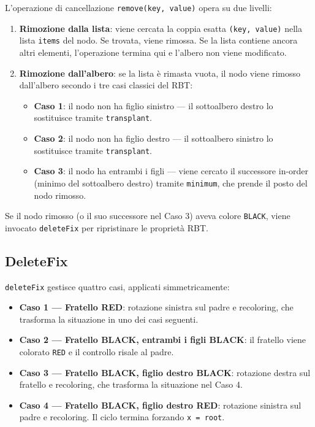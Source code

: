 L'operazione di cancellazione \texttt{remove(key, value)} opera su due livelli:

\begin{enumerate}
    \item \textbf{Rimozione dalla lista}: viene cercata la coppia esatta 
    \texttt{(key, value)} nella lista \texttt{items} del nodo. Se trovata, 
    viene rimossa. Se la lista contiene ancora altri elementi, l'operazione 
    termina qui e l'albero non viene modificato.
    \item \textbf{Rimozione dall'albero}: se la lista è rimasta vuota, il nodo 
    viene rimosso dall'albero secondo i tre casi classici del RBT:
    \begin{itemize}
        \item \textbf{Caso 1}: il nodo non ha figlio sinistro --- il sottoalbero 
        destro lo sostituisce tramite \texttt{transplant}.
        \item \textbf{Caso 2}: il nodo non ha figlio destro --- il sottoalbero 
        sinistro lo sostituisce tramite \texttt{transplant}.
        \item \textbf{Caso 3}: il nodo ha entrambi i figli --- viene cercato il 
        successore in-order (minimo del sottoalbero destro) tramite 
        \texttt{minimum}, che prende il posto del nodo rimosso.
    \end{itemize}
\end{enumerate}

Se il nodo rimosso (o il suo successore nel Caso 3) aveva colore \texttt{BLACK}, 
viene invocato \texttt{deleteFix} per ripristinare le proprietà RBT.

\subsection{DeleteFix}

\texttt{deleteFix} gestisce quattro casi, applicati simmetricamente:

\begin{itemize}
    \item \textbf{Caso 1 --- Fratello RED}: rotazione sinistra sul padre e 
    recoloring, che trasforma la situazione in uno dei casi seguenti.
    \item \textbf{Caso 2 --- Fratello BLACK, entrambi i figli BLACK}: il fratello 
    viene colorato \texttt{RED} e il controllo risale al padre.
    \item \textbf{Caso 3 --- Fratello BLACK, figlio destro BLACK}: rotazione destra 
    sul fratello e recoloring, che trasforma la situazione nel Caso 4.
    \item \textbf{Caso 4 --- Fratello BLACK, figlio destro RED}: rotazione sinistra 
    sul padre e recoloring. Il ciclo termina forzando \texttt{x = root}.
\end{itemize}

